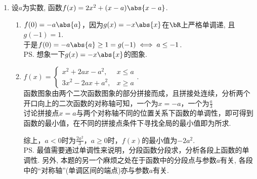 \begin{enumerate}
\begin{enumerate}
\begin{jieda}
        \ps 分段函数的最小值要比每一段内所有的函数值都要小.
    \end{jieda}
    \item 设$a$为实数, 函数$f(x)=2x^2+(x-a)\abs{x-a}$. \\
    \begin{jieda}
    \begin{enumerate}[1.]
    \item $f(0)=-a\abs{a}$，因为$g(x)=-x\abs{x}$在$\bR$上严格单调递, 且$g(-1)=1$. \\
    于是$f(0)=-a\abs{a}\geq 1=g(-1)\iff a\leq -1$.  \\
    \ps 想象一下$g(x)=-x\abs{x}$的图象.
    \item $f(x)=\begin{cases}
    x^2+2ax-a^2, & x\leq a\\
    3x^2-2ax+a^2, & x\geq a
    \end{cases}$. \\
    函数图象由两个二次函数图象的部分拼接而成，且拼接处连续，分析两个开口向上的二次函数的对称轴可知，一个为$x = -a$，一个为$\frac{a}{3}$ \\
    讨论拼接点$x = a$与两个对称轴不同的位置关系下函数的单调性，即可得到函数的最小值，在不同的拼接点条件下寻找全局的最小值即为所求. 
    综上，$a < 0$时为$\frac{2a^2}{3}$，$a \geq 0$时，$f(x)$的最小值为$-2a^2$. \\
    \ps 最值需要通过单调性来说明，分段函数分段求，分析各段上函数的单调性.
    另外, 本题的另一个麻烦之处在于函数中的分段点与参数$a$有关, 各段中的``对称轴''(单调区间的端点)亦与参数$a$有关. 
    \end{enumerate}
    \end{jieda}

\end{enumerate}
\end{enumerate}
